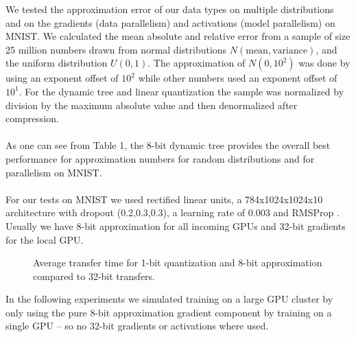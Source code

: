 \documentclass{article} %
\begin{document}
We tested the approximation error of our data types on multiple distributions and on the gradients (data parallelism) and activations (model parallelism) on MNIST. We calculated the mean absolute and relative error from a sample of size 25 million numbers drawn from normal distributions $N(\mbox{mean},\mbox{variance})$, and the uniform distribution $U(0,1)$. The approximation of $N(0,10^2)$ was done by using an exponent offset of $10^2$ while other numbers used an exponent offset of $10^1$. For the dynamic tree and linear quantization the sample was normalized by division by the maximum absolute value and then denormalized after compression. \\\\
As one can see from Table 1, the 8-bit dynamic tree provides the overall best performance for approximation numbers for random distributions and for parallelism on MNIST. \\\\
For our tests on MNIST we used rectified linear units, a 784x1024x1024x10 architecture with dropout (0.2,0.3,0.3), a learning rate of 0.003 and RMSProp  \citep{tieleman2012lecture}. Usually we have 8-bit approximation for all incoming GPUs and 32-bit gradients for the local GPU.
\begin{figure}[t]
	\begin{center}
	\end{center}
	\caption{Average transfer time for 1-bit quantization and 8-bit approximation compared to 32-bit transfers.}
\end{figure}
In the following experiments we simulated training on a large GPU cluster by only using the pure 8-bit approximation gradient component by training on a single GPU -- so no 32-bit gradients or activations where used. \\
\end{document}
